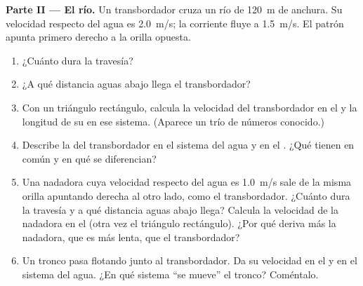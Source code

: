 \begin{problem}
\medskip
\noindent\textbf{Parte II --- El río.}
Un transbordador cruza un río de \qty{120}{m} de anchura. Su velocidad
respecto del agua es \qty{2.0}{m/s}; la corriente fluye a
\qty{1.5}{m/s}. El patrón apunta primero derecho a la orilla opuesta.
\begin{enumerate}[resume]
  \item ¿Cuánto dura la travesía?
  \item ¿A qué distancia aguas abajo llega el transbordador?
  \item Con un triángulo rectángulo, calcula la velocidad del
        transbordador en el  y la longitud de su
         en ese sistema. (Aparece un trío de números
        conocido.)
  \item Describe la  del transbordador en el sistema del agua
        y en el . ¿Qué tienen en común y en qué se
        diferencian?
  \item Una nadadora cuya velocidad respecto del agua es \qty{1.0}{m/s}
        sale de la misma orilla apuntando derecha al otro lado, como el
        transbordador. ¿Cuánto dura la travesía y a qué distancia aguas
        abajo llega? Calcula la velocidad de la nadadora en el  (otra vez el triángulo rectángulo). ¿Por qué deriva
        más la nadadora, que es más lenta, que el transbordador?
  \item Un tronco pasa flotando junto al transbordador. Da su velocidad
        en el  y en el sistema del agua. ¿En qué
        sistema ``se mueve'' el tronco? Coméntalo.
\end{enumerate}


\end{problem}
